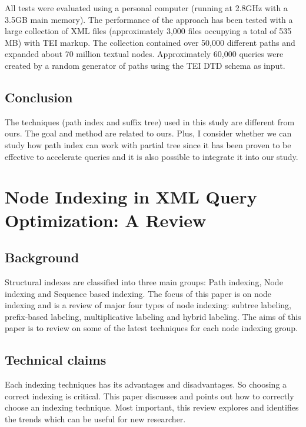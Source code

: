 \documentclass{paper}
\begin{document}
	All tests were evaluated using a personal computer (running at 2.8GHz
	with a 3.5GB main memory).	
	The performance of the approach has been tested with a large
	collection of XML files (approximately 3,000 files occupying a total
	of 535 MB) with TEI markup. The collection contained over 50,000
	different paths and expanded about 70 million textual nodes.
	Approximately 60,000 queries were created by a random generator of
	paths using the TEI DTD schema as input. 
	
	\subsection{Conclusion}
	
	The techniques (path index and suffix tree) used in this study are 
	different from ours. The goal and method are related to ours. Plus, 
	I consider whether we can study how path index can work with partial 
	tree since it has been proven to be effective to accelerate queries 
	and it is also possible to integrate it into our study.
	
	
	\section{Node Indexing in XML Query Optimization: A Review}
	
	\subsection{Background}
	
	Structural indexes are classified into three main  groups: Path indexing, Node
	indexing and Sequence based indexing. The focus of this paper is
	on node indexing and is a review of major four types of node indexing:
	subtree labeling, prefix-based labeling, multiplicative labeling and hybrid
	labeling. The aims of this paper is to review on some of the latest techniques
	for each node indexing group.
	
	
	\subsection{Technical claims}
	
	Each indexing techniques has its advantages and disadvantages. So choosing a
	correct indexing is critical. This paper discusses and points out how to
	correctly choose an indexing technique. Most important, this review explores and
	identifies the trends which can be useful for new researcher.
	
\end{document}
